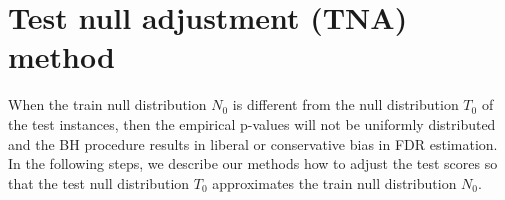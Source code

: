 \documentclass{article}
\begin{document}
%
%
%
%
%
%    
%    
%    
%    
%
%    

\section{Test null adjustment (TNA) method}
When the train null distribution $N_0$ is different from the null distribution $T_0$ of the test instances, then the empirical p-values will not be uniformly distributed and the BH procedure results in liberal or conservative bias in FDR estimation. In the following steps, we describe our methods how to adjust the test scores so that the test null distribution $T_0$ approximates the train null distribution $N_0$.
\end{document}
